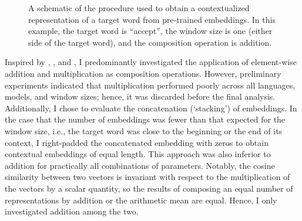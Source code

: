 \begin{figure}
  \centering
  \newcommand{\period}{\text{.}}
  \newcommand*{\orawidest}{accept}
  \newcommand*{\oratallest}{\#\#}
  \newlength{\orawidth}
  \settowidth{\orawidth}{\orawidest}
  \newcommand*{\ora}[1]{\overrightarrow{#1\vphantom{\oratallest}}}
  \caption{A schematic of the procedure used
    to obtain a contextualized representation of a target word from pre-trained embeddings.
    In this example, the target word is ``accept'', the window size is one (either side of
    the target word), and the composition operation is addition.
  }
  \label{chart:schematic-procedure}
\end{figure}

Inspired by \textcite{Landauer1997}, \textcite{Kintsch2001}, and
\textcite{Mitchell2008}, I predominantly investigated the application of element-wise
addition and multiplication as composition operations.
However, preliminary experiments indicated that multiplication performed poorly across
all languages, models, and window sizes; hence, it was discarded before the final
analysis.
Additionally, I chose to evaluate the concatenation (`stacking') of embeddings.
In the case that the number of embeddings was fewer than that expected for the window
size, i.e., the target word was close to the beginning or the end of its context, I
right-padded the concatenated embedding with zeros to obtain contextual embeddings of
equal length.
This approach was also inferior to addition for practically all combinations of
parameters.
Notably, the cosine similarity between two vectors is invariant with respect to the
multiplication of the vectors by a scalar quantity, so the results of composing an
equal number of representations by addition or the arithmetic mean are equal.
Hence, I only investigated addition among the two.


